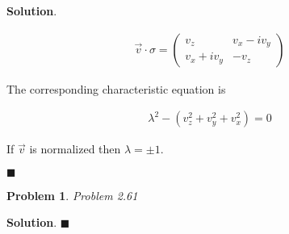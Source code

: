\documentclass[12pt]{article}
\newtheorem{p}{Problem}
\theoremstyle{definition}
\newenvironment{s}{%
        \begin{trivlist} \item \textbf{Solution}. }{%
            \hspace*{\fill} $\blacksquare$\end{trivlist}}%
\begin{document}
{\begin{s}

\begin{align*}
\vec{v}\cdot \sigma =
\begin{pmatrix}
v_{z} & v_{x} - iv_{y}\\
v_{x}+iv_{y} & -v_{z}
\end{pmatrix}
\end{align*}

The corresponding characteristic equation is

\begin{align*}
\lambda^{2} - (v_{z}^{2} + v_{y}^{2} + v_{x}^{2}) = 0
\end{align*}

If $\vec{v}$ is normalized then $\lambda = \pm 1$.


\end{s}
\begin{p}
Problem 2.61
\end{p}

\begin{s}
\end{s}
\end{document}

